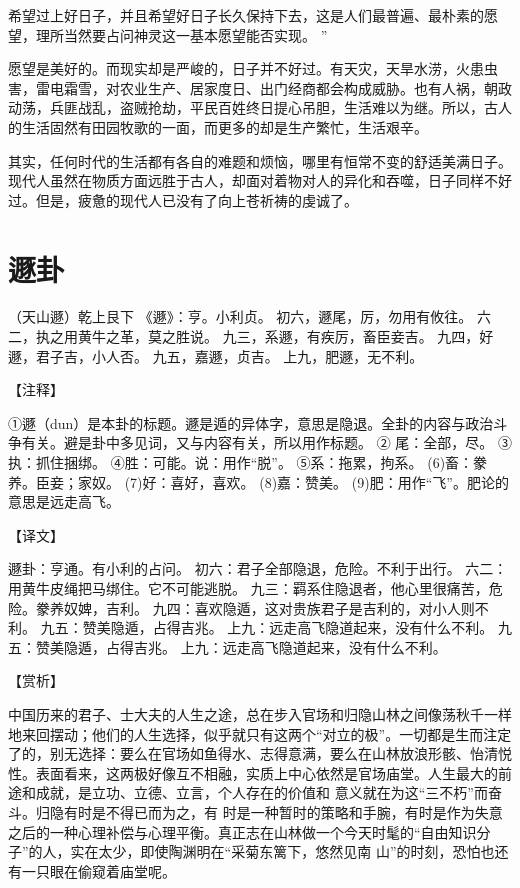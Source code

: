 \documentclass[a4paper,12pt,UTF8,twoside]{ctexbook}
\begin{document}
希望过上好日子，并且希望好日子长久保持下去，这是人们最普遍、最朴素的愿望，理所当然要占问神灵这一基本愿望能否实现。 ”

愿望是美好的。而现实却是严峻的，日子并不好过。有天灾，天旱水涝，火患虫害，雷电霜雪，对农业生产、居家度日、出门经商都会构成威胁。也有人祸，朝政动荡，兵匪战乱，盗贼抢劫，平民百姓终日提心吊胆，生活难以为继。所以，古人的生活固然有田园牧歌的一面，而更多的却是生产繁忙，生活艰辛。

其实，任何时代的生活都有各自的难题和烦恼，哪里有恒常不变的舒适美满日子。现代人虽然在物质方面远胜于古人，却面对着物对人的异化和吞噬，日子同样不好过。但是，疲惫的现代人已没有了向上苍祈祷的虔诚了。

\chapter{遯卦}

（天山遯）乾上艮下
《遯》：亨。小利贞。
初六，遯尾，厉，勿用有攸往。
六二，执之用黄牛之革，莫之胜说。
九三，系遯，有疾厉，畜臣妾吉。
九四，好遯，君子吉，小人否。
九五，嘉遯，贞吉。
上九，肥遯，无不利。

【注释】

①遯（dun）是本卦的标题。遯是遁的异体字，意思是隐退。全卦的内容与政治斗争有关。避是卦中多见词，又与内容有关，所以用作标题。
② 尾：全部，尽。
③执：抓住捆绑。
④胜：可能。说：用作“脱”。
⑤系：拖累，拘系。
(6)畜：豢养。臣妾；家奴。
(7)好：喜好，喜欢。
(8)嘉：赞美。
(9)肥：用作“飞”。肥论的意思是远走高飞。

【译文】

遯卦：亨通。有小利的占问。
初六：君子全部隐退，危险。不利于出行。
六二：用黄牛皮绳把马绑住。它不可能逃脱。
九三：羁系住隐退者，他心里很痛苦，危险。豢养奴婢，吉利。
九四：喜欢隐遁，这对贵族君子是吉利的，对小人则不利。
九五：赞美隐遁，占得吉兆。
上九：远走高飞隐道起来，没有什么不利。
九五：赞美隐遁，占得吉兆。
上九：远走高飞隐道起来，没有什么不利。

【赏析】

中国历来的君子、士大夫的人生之途，总在步入官场和归隐山林之间像荡秋千一样地来回摆动；他们的人生选择，似乎就只有这两个“对立的极”。一切都是生而注定了的，别无选择：要么在官场如鱼得水、志得意满，要么在山林放浪形骸、怡清悦性。表面看来，这两极好像互不相融，实质上中心依然是官场庙堂。人生最大的前途和成就，是立功、立德、立言，个人存在的价值和 意义就在为这“三不朽”而奋斗。归隐有时是不得已而为之，有 时是一种暂时的策略和手腕，有时是作为失意之后的一种心理补偿与心理平衡。真正志在山林做一个今天时髦的“自由知识分 子”的人，实在太少，即使陶渊明在“采菊东篱下，悠然见南 山”的时刻，恐怕也还有一只眼在偷窥着庙堂呢。
\end{document}
